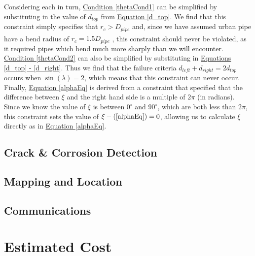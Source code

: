 \documentclass[11pt]{article}		%
\begin{document}
		Considering each in turn, \hyperref[thetaCond1]{Condition \ref*{thetaCond1}} can be simplified by substituting in the value of $d_{top}$ from \hyperref[d_top]{Equation \ref*{d_top}}.
		We find that this constraint simply specifies that $r_c > D_{pipe}$ and, since we have assumed urban pipe have a bend radius of $r_c =  1.5 D_{pipe} $ \textsuperscript{\cite{roh2005differential}}, this constraint should never be violated, as it required pipes which bend much more sharply than we will encounter.
		\\
		\hyperref[thetaCond2]{Condition \ref*{thetaCond2}} can also be simplified by substituting in \hyperref[d_left]{Equations \ref*{d_top} - \ref*{d_right}}. 
		Thus we find that the failure criteria $d_{left} + d_{right} = 2 d_{top}$ occurs when $\sin \left( \lambda \right) = 2$, which means that this constraint can never occur.
		\\
		Finally, \hyperref[alphaEq]{Equation \ref*{alphaEq}} is derived from a constraint that specified that the difference between $\xi$ and the right hand side is a multiple of $2 \pi$ (in radians).
		Since we know the value of $\xi$ is between $0^\circ$ and $90^\circ$, which are both less than $2 \pi$, this constraint sets the value of $\xi - (\ref*{alphaEq}) = 0$, allowing us to calculate $\xi$ directly as in \hyperref[alphaEq]{Equation \ref*{alphaEq}}.
				
		\subsection{Crack \& Corrosion Detection}
		
		\subsection{Mapping and Location}
		
		\subsection{Communications}
		
	\section{Estimated Cost}
	
	
	\pagebreak		%
	
	
	
	\begingroup\onehalfspacing
		{\small
			
			
		}
	\endgroup
\end{document}
